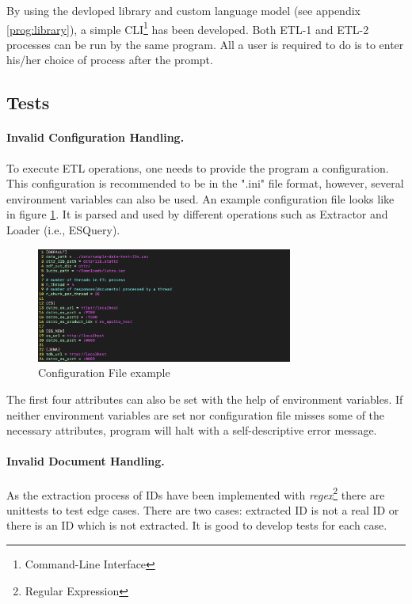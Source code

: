 By using the devloped library and custom language model (see appendix \ref{prog:library}), a simple 
CLI\footnote{Command-Line Interface} has been developed. Both ETL-1 and ETL-2 processes 
can be run by the same program. All a user is required to do is to enter his/her choice of 
process after the prompt.

\subsection{Tests}

\paragraph{Invalid Configuration Handling.}
To execute ETL operations, one needs to provide the program a configuration. This configuration is 
recommended to be in the ".ini" file format, however, several environment variables can also be 
used. An example configuration file looks like in figure \ref{fig:config_example}. It is parsed and 
used by different operations such as Extractor and Loader (i.e., ESQuery).

\begin{figure}[H]
	\centering
	\includegraphics[width=0.75\textwidth]{../../resources/config_example.png}
	\caption{Configuration File example}
	\label{fig:config_example}
\end{figure}

The first four attributes can also be set with the help of environment variables. If neither 
environment variables are set nor configuration file misses some of the necessary attributes, 
program will halt with a self-descriptive error message.

\paragraph{Invalid Document Handling.}
As the extraction process of IDs have been implemented with 
\textit{regex}\footnote{Regular Expression} there are unittests to test edge cases. There are two 
cases: extracted ID is not a real ID or there is an ID which is not extracted. It is good to develop 
tests for each case.

